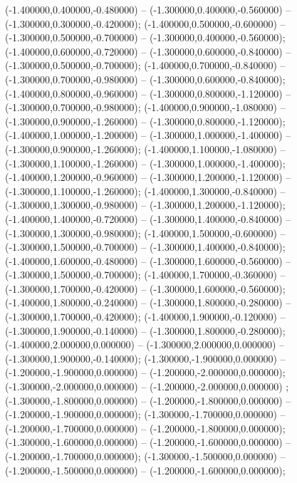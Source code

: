  (-1.400000,0.400000,-0.480000) -- (-1.300000,0.400000,-0.560000) -- (-1.300000,0.300000,-0.420000);
 (-1.400000,0.500000,-0.600000) -- (-1.300000,0.500000,-0.700000) -- (-1.300000,0.400000,-0.560000);
 (-1.400000,0.600000,-0.720000) -- (-1.300000,0.600000,-0.840000) -- (-1.300000,0.500000,-0.700000);
 (-1.400000,0.700000,-0.840000) -- (-1.300000,0.700000,-0.980000) -- (-1.300000,0.600000,-0.840000);
 (-1.400000,0.800000,-0.960000) -- (-1.300000,0.800000,-1.120000) -- (-1.300000,0.700000,-0.980000);
 (-1.400000,0.900000,-1.080000) -- (-1.300000,0.900000,-1.260000) -- (-1.300000,0.800000,-1.120000);
 (-1.400000,1.000000,-1.200000) -- (-1.300000,1.000000,-1.400000) -- (-1.300000,0.900000,-1.260000);
 (-1.400000,1.100000,-1.080000) -- (-1.300000,1.100000,-1.260000) -- (-1.300000,1.000000,-1.400000);
 (-1.400000,1.200000,-0.960000) -- (-1.300000,1.200000,-1.120000) -- (-1.300000,1.100000,-1.260000);
 (-1.400000,1.300000,-0.840000) -- (-1.300000,1.300000,-0.980000) -- (-1.300000,1.200000,-1.120000);
 (-1.400000,1.400000,-0.720000) -- (-1.300000,1.400000,-0.840000) -- (-1.300000,1.300000,-0.980000);
 (-1.400000,1.500000,-0.600000) -- (-1.300000,1.500000,-0.700000) -- (-1.300000,1.400000,-0.840000);
 (-1.400000,1.600000,-0.480000) -- (-1.300000,1.600000,-0.560000) -- (-1.300000,1.500000,-0.700000);
 (-1.400000,1.700000,-0.360000) -- (-1.300000,1.700000,-0.420000) -- (-1.300000,1.600000,-0.560000);
 (-1.400000,1.800000,-0.240000) -- (-1.300000,1.800000,-0.280000) -- (-1.300000,1.700000,-0.420000);
 (-1.400000,1.900000,-0.120000) -- (-1.300000,1.900000,-0.140000) -- (-1.300000,1.800000,-0.280000);
 (-1.400000,2.000000,0.000000) -- (-1.300000,2.000000,0.000000) -- (-1.300000,1.900000,-0.140000);
 (-1.300000,-1.900000,0.000000) -- (-1.200000,-1.900000,0.000000) -- (-1.200000,-2.000000,0.000000);
 (-1.300000,-2.000000,0.000000) -- (-1.200000,-2.000000,0.000000) ;
 (-1.300000,-1.800000,0.000000) -- (-1.200000,-1.800000,0.000000) -- (-1.200000,-1.900000,0.000000);
 (-1.300000,-1.700000,0.000000) -- (-1.200000,-1.700000,0.000000) -- (-1.200000,-1.800000,0.000000);
 (-1.300000,-1.600000,0.000000) -- (-1.200000,-1.600000,0.000000) -- (-1.200000,-1.700000,0.000000);
 (-1.300000,-1.500000,0.000000) -- (-1.200000,-1.500000,0.000000) -- (-1.200000,-1.600000,0.000000);
